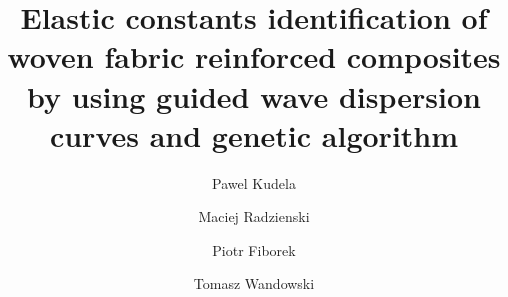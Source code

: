 \documentclass[preprint,12pt]{elsarticle}
\providecommand{\DIFaddbegin}{} %
\providecommand{\DIFaddend}{} %
\providecommand{\DIFdelbegin}{} %
\providecommand{\DIFdelend}{} %
\begin{document}
	\begin{frontmatter}

		\title{Elastic constants identification of woven fabric reinforced composites by using guided wave dispersion curves and genetic algorithm}

		\address[IFFM]{Institute of Fluid Flow Machinery, Polish Academy of Sciences, Poland}

		\DIFdelbegin %

\DIFdelend \author{Pawel Kudela}
		\DIFaddbegin {}
		\DIFaddend \author{Maciej Radzienski}
		\author{Piotr Fiborek }
		\author{Tomasz Wandowski }	

		\DIFaddbegin {}


\end{frontmatter}
\end{document}
